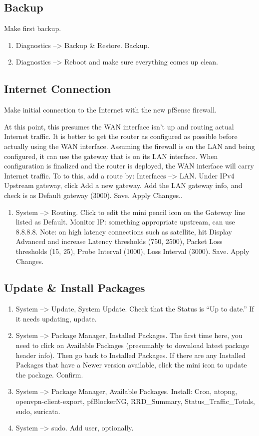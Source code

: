 \subsection{Backup}
Make first backup.

\begin{enumerate}
 \item Diagnostics --> Backup \& Restore. Backup.
 \item Diagnostics --> Reboot and make sure everything comes up clean.
\end{enumerate}

\subsection{Internet Connection}
Make initial connection to the Internet with the new pfSense firewall.


At this point, this presumes the WAN interface isn't up and routing actual Internet traffic. It is better to get the router as configured as possible before actually using the WAN interface. Assuming the firewall is on the LAN and being configured, it can use the gateway that is on its LAN interface. When configuration is finalized and the router is deployed, the WAN interface will carry Internet traffic. To to this, add a route by: Interfaces --> LAN. Under IPv4 Upstream gateway, click Add a new gateway. Add the LAN gateway info, and check is as Default gateway (3000). Save. Apply Changes..

\begin{enumerate}
 \item System --> Routing. Click to edit the mini pencil icon on the Gateway line listed as Default. Monitor IP: something appropriate upstream, can use 8.8.8.8. Note: on high latency connections such as satellite, hit Display Advanced and increase Latency thresholds (750, 2500), Packet Loss thresholds (15, 25), Probe Interval (1000), Loss Interval (3000). Save. Apply Changes.
\end{enumerate}

\subsection{Update \& Install Packages}
\begin{enumerate}
 \item System --> Update, System Update. Check that the Status is ``Up to date.'' If it needs updating, update.
 \item System --> Package Manager, Installed Packages. The first time here, you need to click on Available Packages (presumably to download latest package header info). Then go back to Installed Packages. If there are any Installed Packages that have a Newer version available, click the mini icon to update the package. Confirm.
 \item System --> Package Manager, Available Packages. Install: Cron, ntopng, openvpn-client-export, pfBlockerNG, RRD\_Summary, Status\_Traffic\_Totals, sudo, suricata.
 \item System --> sudo. Add user, optionally.
\end{enumerate}


